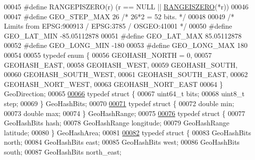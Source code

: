 \begin{DoxyCode}
00045 \textcolor{preprocessor}{#}\textcolor{preprocessor}{define} \textcolor{preprocessor}{RANGEPISZERO}\textcolor{preprocessor}{(}\textcolor{preprocessor}{r}\textcolor{preprocessor}{)} \textcolor{preprocessor}{(}\textcolor{preprocessor}{r} \textcolor{preprocessor}{==} NULL \textcolor{preprocessor}{||} \hyperlink{geohash_8h_aa0025397de7ebbc5b0ee9bf2c1c64221}{RANGEISZERO}\textcolor{preprocessor}{(}\textcolor{preprocessor}{*}\textcolor{preprocessor}{r}\textcolor{preprocessor}{)}\textcolor{preprocessor}{)}
00046 
00047 \textcolor{preprocessor}{#}\textcolor{preprocessor}{define} \textcolor{preprocessor}{GEO\_STEP\_MAX} 26 \textcolor{comment}{/* 26*2 = 52 bits. */}
00048 
00049 \textcolor{comment}{/* Limits from EPSG:900913 / EPSG:3785 / OSGEO:41001 */}
00050 \textcolor{preprocessor}{#}\textcolor{preprocessor}{define} \textcolor{preprocessor}{GEO\_LAT\_MIN} \textcolor{preprocessor}{-}85.05112878
00051 \textcolor{preprocessor}{#}\textcolor{preprocessor}{define} \textcolor{preprocessor}{GEO\_LAT\_MAX} 85.05112878
00052 \textcolor{preprocessor}{#}\textcolor{preprocessor}{define} \textcolor{preprocessor}{GEO\_LONG\_MIN} \textcolor{preprocessor}{-}180
00053 \textcolor{preprocessor}{#}\textcolor{preprocessor}{define} \textcolor{preprocessor}{GEO\_LONG\_MAX} 180
00054 
00055 \textcolor{keyword}{typedef} \textcolor{keyword}{enum} \{
00056     GEOHASH\_NORTH = 0,
00057     GEOHASH\_EAST,
00058     GEOHASH\_WEST,
00059     GEOHASH\_SOUTH,
00060     GEOHASH\_SOUTH\_WEST,
00061     GEOHASH\_SOUTH\_EAST,
00062     GEOHASH\_NORT\_WEST,
00063     GEOHASH\_NORT\_EAST
00064 \} GeoDirection;
00065 
\hyperlink{structGeoHashBits}{00066} \textcolor{keyword}{typedef} \textcolor{keyword}{struct} \{
00067     uint64\_t bits;
00068     uint8\_t step;
00069 \} GeoHashBits;
00070 
\hyperlink{structGeoHashRange}{00071} \textcolor{keyword}{typedef} \textcolor{keyword}{struct} \{
00072     \textcolor{keywordtype}{double} min;
00073     \textcolor{keywordtype}{double} max;
00074 \} GeoHashRange;
00075 
\hyperlink{structGeoHashArea}{00076} \textcolor{keyword}{typedef} \textcolor{keyword}{struct} \{
00077     GeoHashBits hash;
00078     GeoHashRange longitude;
00079     GeoHashRange latitude;
00080 \} GeoHashArea;
00081 
\hyperlink{structGeoHashNeighbors}{00082} \textcolor{keyword}{typedef} \textcolor{keyword}{struct} \{
00083     GeoHashBits north;
00084     GeoHashBits east;
00085     GeoHashBits west;
00086     GeoHashBits south;
00087     GeoHashBits north\_east;

\end{DoxyCode}
